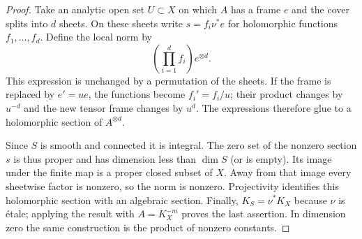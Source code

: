 \begin{proof}
Take an analytic open set $U\subset X$ on which $A$ has a frame $e$
and the cover splits into $d$ sheets.  On these sheets write
$s=f_i\nu^*e$ for holomorphic functions $f_1,\ldots,f_d$.
Define the local norm by
\[
                    \left(\prod_{i=1}^d f_i\right)e^{\otimes d}.
\]
This expression is unchanged by a permutation of the sheets.
If the frame is replaced by $e'=u e$, the functions become
$f_i'=f_i/u$; their product changes by $u^{-d}$ and the new tensor
frame changes by $u^d$.  The expressions therefore glue to a
holomorphic section of $A^{\otimes d}$.

Since $S$ is smooth and connected it is integral.  The zero set of the
nonzero section $s$ is thus proper and has dimension less than
$\dim S$ (or is empty).  Its image under the finite map is a proper
closed subset of $X$.  Away from that image every sheetwise factor is
nonzero, so the norm is nonzero.  Projectivity identifies this
holomorphic section with an algebraic section.  Finally,
$K_S=\nu^*K_X$ because $\nu$ is \'etale; applying the result
with $A=K_X^{-m}$ proves the last assertion.  In dimension zero the
same construction is the product of nonzero constants.
\end{proof}
